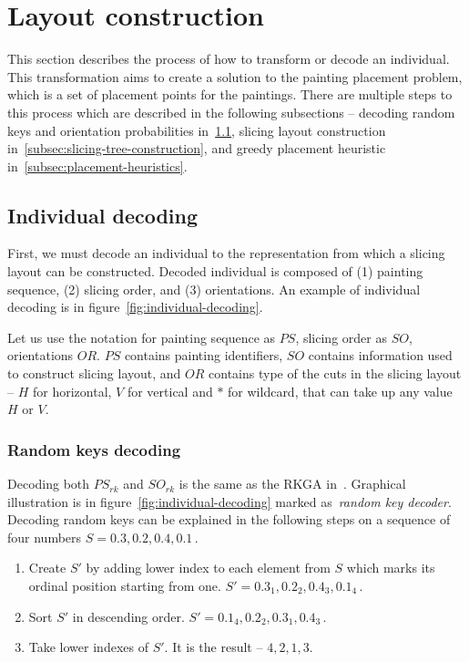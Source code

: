\section{Layout construction}\label{sec:layout-construction}

This section describes the process of how to transform or decode an individual.
This transformation aims to create a solution to the painting placement problem,
which is a set of placement points for the paintings.
There are multiple steps to this process which are described in the following subsections
– decoding random keys and orientation probabilities in~\ref{subsec:individual-decoding},
slicing layout construction in~\ref{subsec:slicing-tree-construction},
and greedy placement heuristic in~\ref{subsec:placement-heuristics}.

\subsection{Individual decoding}\label{subsec:individual-decoding}
First, we must decode an individual to the representation from which a slicing layout can be constructed.
Decoded individual is composed of (1) painting sequence, (2) slicing order, and (3) orientations.
An example of individual decoding is in figure~\ref{fig:individual-decoding}.

Let us use the notation for painting sequence as $PS$, slicing order as $SO$, orientations $OR$.
$PS$ contains painting identifiers, $SO$ contains information used to construct slicing layout,
and $OR$ contains type of the cuts in the slicing layout – $H$ for horizontal, $V$ for vertical
and $*$ for wildcard, that can take up any value $H$ or $V$.

\subsubsection*{Random keys decoding}
Decoding both $PS_{rk}$ and $SO_{rk}$ is the same as the RKGA in~\cite{beanGeneticAlgorithmsRandom1994}.
Graphical illustration is in figure~\ref{fig:individual-decoding} marked as~\textit{random key decoder}.
Decoding random keys can be explained in the following steps on a sequence of four numbers $S = 0.3, 0.2, 0.4, 0.1$\,.

\begin{enumerate}
    \item Create $S'$ by adding lower index to each element from $S$ which marks its ordinal position starting from one.
    $S' = 0.3_1, 0.2_2, 0.4_3, 0.1_4$\,.
    \item Sort $S'$ in descending order. $S' = 0.1_4, 0.2_2,  0.3_1, 0.4_3$\,.
    \item Take lower indexes of $S'$.
    It is the result – $4, 2, 1, 3$.
\end{enumerate}


